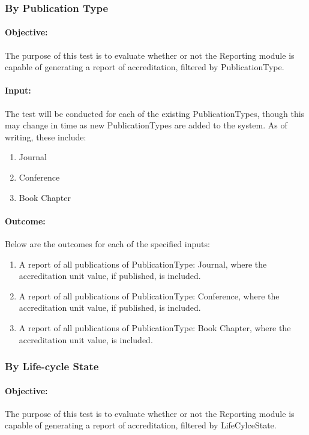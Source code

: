 \subsubsection{By Publication Type} \label{ti_ar_pubtype}
\paragraph{Objective:}
The purpose of this test is to evaluate whether or not the Reporting module is capable of
generating a report of accreditation, filtered by PublicationType.
\paragraph{Input:}
The test will be conducted for each of the existing PublicationTypes, though this may change in time as new PublicationTypes are added to the system. As of writing, these include:
\begin{enumerate}
	\item Journal
	\item Conference
	\item Book Chapter
\end{enumerate}
\paragraph{Outcome:}
Below are the outcomes for each of the specified inputs:
\begin{enumerate}
	\item A report of all publications of PublicationType: Journal, where the accreditation unit value, if published, is included.
	\item A report of all publications of PublicationType: Conference, where the accreditation unit value, if published, is included.
	\item A report of all publications of PublicationType: Book Chapter, where the accreditation unit value, is included.
\end{enumerate}

\subsubsection{By Life-cycle State} \label{ti_ar_lcs}
\paragraph{Objective:}
The purpose of this test is to evaluate whether or not the Reporting module is capable of
generating a report of accreditation, filtered by LifeCylceState.
